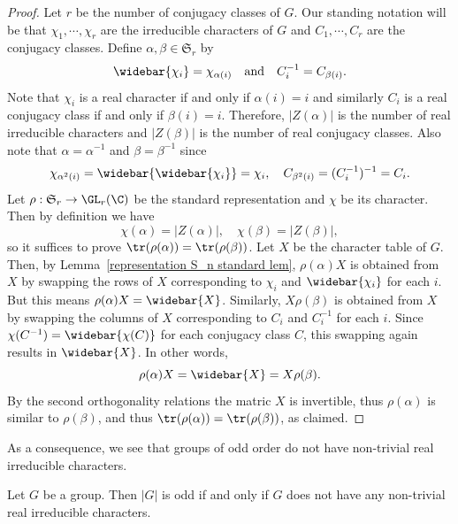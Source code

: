\begin{proof}
Let $r$ be the number of conjugacy classes of $G$. Our standing notation will be that $\chi_1,\cdots,\chi_r$ are the irreducible characters of $G$ and $C_1,\cdots,C_r$ are the conjugacy classes. Define $\alpha,\beta\in\mathfrak{S}_r$ by 
\[\widebar{\chi_i}=\chi_{\alpha(i)}\quad\text{and}\quad C^{-1}_i=C_{\beta(i)}.\]
Note that $\chi_i$ is a real character if and only if $\alpha(i)=i$ and similarly $C_i$ is a real conjugacy class if and only if $\beta(i)=i$. Therefore, $|Z(\alpha)|$ is the number of real irreducible characters and $|Z(\beta)|$ is the number of real conjugacy classes. Also note that $\alpha=\alpha^{-1}$ and $\beta=\beta^{-1}$ since 
\[\chi_{\alpha^2(i)}=\widebar{\widebar{\chi_i}}=\chi_i,\quad C_{\beta^2(i)}=(C_i^{-1})^{-1}=C_i.\]
Let $\rho:\mathfrak{S}_r\to\GL_r(\C)$ be the standard representation and $\chi$ be its character. Then by definition we have 
\[\chi(\alpha)=|Z(\alpha)|,\quad\chi(\beta)=|Z(\beta)|,\]
so it suffices to prove $\tr(\rho(\alpha))=\tr(\rho(\beta))$. Let $X$ be the character table of $G$. Then, by Lemma~\ref{representation S_n standard lem}, $\rho(\alpha)X$ is obtained from $X$ by swapping the rows of $X$ corresponding to $\chi_i$ and $\widebar{\chi_i}$ for each $i$. But this means $\rho(\alpha)X=\widebar{X}$. Similarly, $X\rho(\beta)$ is obtained from $X$ by swapping the columns of $X$ corresponding to $C_i$ and $C_i^{-1}$ for each $i$. Since $\chi(C^{-1})=\widebar{\chi(C)}$ for each conjugacy class $C$, this swapping again results in $\widebar{X}$. In other words,
\[\rho(\alpha)X=\widebar{X}=X\rho(\beta).\]
By the second orthogonality relations the matric $X$ is invertible, thus $\rho(\alpha)$ is similar to $\rho(\beta)$, and thus $\tr(\rho(\alpha))=\tr(\rho(\beta))$, as claimed.
\end{proof}
As a consequence, we see that groups of odd order do not have non-trivial real irreducible characters.
\begin{proposition}\label{group have real character iff odd order}
Let $G$ be a group. Then $|G|$ is odd if and only if $G$ does not have any non-trivial real irreducible characters.
\end{proposition}
